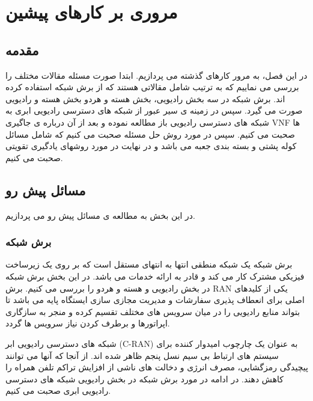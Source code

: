 \chapter{مروری بر کارهای پیشین}

\section{مقدمه}
در این فصل، به مرور کارهای گذشته می پردازیم.
ابتدا صورت مسئله مقالات مختلف را بررسی می نماییم که
 به ترتیب شامل مقالاتی هستند که از برش شبکه استفاده کرده اند.
برش شبکه در سه بخش رادیویی، بخش هسته و هردو بخش هسته و رادیویی صورت می گیرد.
سپس در زمینه ی سیر عبور از شبکه های دسترسی رادیویی ابری به شبکه های دسترسی رادیویی باز مطالعه نموده و بعد از آن درباره ی جاگیری VNF ها صحبت می کنیم.
سپس در مورد روش حل مسئله صحبت می کنیم که شامل مسائل کوله پشتی و بسته بندی جعبه می باشد و در نهایت در مورد روشهای یادگیری تقویتی صحبت می کنیم.
\section{مسائل پیش رو}
در این بخش به مطالعه ی مسائل پیش رو می پردازیم. 
\subsection{برش شبکه}
برش شبکه یک شبکه منطقی انتها به انتهای مستقل است که بر روی یک زیرساخت فیزیکی مشترک کار می کند و قادر به ارائه خدمات می باشد.
در این بخش برش شبکه در بخش رادیویی و هسته و هردو را بررسی می کنیم.
برش RAN یکی از کلیدهای اصلی برای انعطاف پذیری سفارشات و مدیریت مجازی سازی ایستگاه پایه می باشد تا بتواند منابع رادیویی را در میان سرویس های مختلف تقسیم کرده و منجر به سازگاری اپراتورها و برطرف کردن نیاز سرویس ها گردد.

شبکه های دسترسی رادیویی ابر (C-RAN) به عنوان یک چارچوب امیدوار کننده برای سیستم های ارتباط بی سیم نسل پنجم ظاهر شده اند.
از آنجا که آنها می توانند پیچیدگی رمزگشایی، مصرف انرژی و دخالت های ناشی از افزایش تراکم تلفن همراه را کاهش دهند\cite{cranInt}.
در ادامه در مورد برش شبکه در بخش رادیویی شبکه های دسترسی رادیویی ابری صحبت می کنیم.

